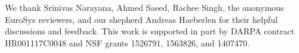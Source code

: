 \begin{acks}
We thank Srinivas Narayana, Ahmed Saeed, Rachee Singh, the anonymous EuroSys reviewers, and our shepherd Andreas Haeberlen for their helpful discussions and feedback.
This work is supported in part by DARPA contract HR001117C0048 and NSF grants 1526791, 1563826, and 1407470.
\end{acks}
